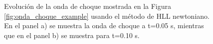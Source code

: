 \documentclass[12pt,a4paper]{book}
\begin{document}
\begin{figure}
\centering
{}
\caption{\label{fig:HLL-prueba1}Evolución de la onda de choque mostrada en la Figura \ref{fig:onda_choque_example} usando el método de HLL newtoniano. En el panel a) se muestra la onda de choque a t=0.05 s, mientras que en el panel b) se muestra para t=0.10 s.} 
\end{figure}
\end{document}
